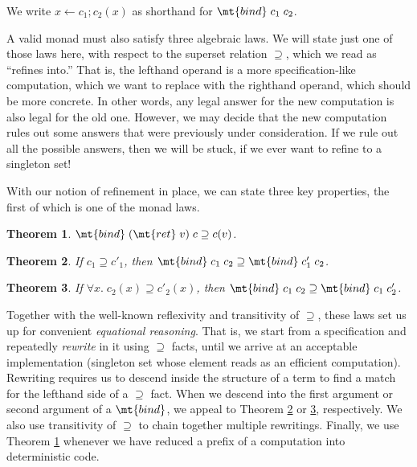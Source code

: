 \documentclass{amsbook}
\newtheorem{theorem}{Theorem}[chapter]
\theoremstyle{definition}
\theoremstyle{remark}
\numberwithin{section}{chapter}
\numberwithin{equation}{chapter}
\begin{document}
We write $x \leftarrow c_1; c_2(x)$ as shorthand for $\mt{bind} \; c_1 \; c_2$.

A valid monad must also satisfy three algebraic laws.
We will state just one of those laws here, with respect to the superset relation $\supseteq$, which we read as ``refines into.''
That is, the lefthand operand is a more specification-like computation, which we want to replace with the righthand operand, which should be more concrete.
In other words, any legal answer for the new computation is also legal for the old one.
However, we may decide that the new computation rules out some answers that were previously under consideration.
If we rule out all the possible answers, then we will be stuck, if we ever want to refine to a singleton set!

With our notion of refinement in place, we can state three key properties, the first of which is one of the monad laws.

\begin{theorem}\label{bindret}
  $\mt{bind} \; (\mt{ret} \; v) \; c \supseteq c(v)$.
\end{theorem}

\begin{theorem}\label{refine1}
  If $c_1 \supseteq c'_1$, then $\mt{bind} \; c_1 \; c_2 \supseteq \mt{bind} \; c'_1 \; c_2$.
\end{theorem}

\begin{theorem}\label{refine2}
  If $\forall x. \; c_2(x) \supseteq c'_2(x)$, then $\mt{bind} \; c_1 \; c_2 \supseteq \mt{bind} \; c_1 \; c'_2$.
\end{theorem}

Together with the well-known reflexivity and transitivity of $\supseteq$, these laws set us up for convenient \emph{equational reasoning}.
That is, we start from a specification and repeatedly \emph{rewrite} in it using $\supseteq$ facts, until we arrive at an acceptable implementation (singleton set whose element reads as an efficient computation).
Rewriting requires us to descend inside the structure of a term to find a match for the lefthand side of a $\supseteq$ fact.
When we descend into the first argument or second argument of a $\mt{bind}$, we appeal to Theorem \ref{refine1} or \ref{refine2}, respectively.
We also use transitivity of $\supseteq$ to chain together multiple rewritings.
Finally, we use Theorem \ref{bindret} whenever we have reduced a prefix of a computation into deterministic code.
\end{document}
